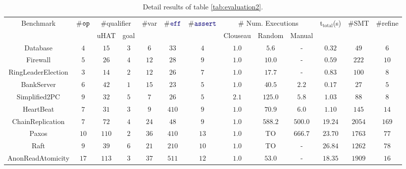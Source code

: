 \begin{table}[t!]
  \renewcommand{\arraystretch}{0.8}
  \caption{\small Detail results of table \ref{tab:evaluation2}.}
\vspace*{-.1in}
\footnotesize
\setlength{\tabcolsep}{3.3pt}
\begin{tabular}{c||ccc||ccc||ccc||c|cc}
  \toprule
Benchmark & \#$\boldsymbol{{\tt op}}$ & \multicolumn{2}{c||}{\#qualifier} & \#var &\#$\mykw{eff}$ & \#$\mykw{assert}$ & \multicolumn{3}{c||}{\scriptsize \# Num. Executions} & t$_\text{total}$(s) & \#SMT & \#refine \\
 &  &uHAT &goal & & & & {\scriptsize Clouseau} & {\scriptsize Random} & {\scriptsize Manual} &  &  \\
 \midrule
 {\scriptsize\textsf{Database}} & $4$ & $15$ & $3$ & $6$ & $3$$3$ & $4$ & $1.0$ & $5.6$ & - & $0.32$ & $49$ & $6$\\
 \midrule
{\scriptsize\textsf{Firewall}}\cite{MessageChain} & $5$ & $26$ & $4$ & $12$ & $2$$8$ & $9$ & $1.0$ & $10.0$ & - & $0.59$ & $222$ & $10$\\
\midrule
{\scriptsize\textsf{RingLeaderElection}}\cite{MessageChain} & $3$ & $14$ & $2$ & $12$ & $2$$6$ & $7$ & $1.0$ & $17.7$ & - & $0.83$ & $100$ & $8$\\
\midrule
{\scriptsize\textsf{BankServer}}\cite{DGJ+13} & $6$ & $42$ & $1$ & $15$ & $2$$3$ & $5$ & $1.0$ & $40.5$ & $2.2$ & $0.17$ & $27$ & $5$\\
\midrule
{\scriptsize\textsf{Simplified2PC}}\cite{DGJ+13} & $9$ & $32$ & $5$ & $7$ & $2$$6$ & $5$ & $2.1$ & $125.0$ & $5.8$ & $1.03$ & $88$ & $8$\\
\midrule
{\scriptsize\textsf{HeartBeat}}\cite{DGJ+13} & $7$ & $31$ & $3$ & $9$ & $4$$10$ & $9$ & $1.0$ & $70.9$ & $6.0$ & $1.10$ & $145$ & $14$\\
\midrule
{\scriptsize\textsf{ChainReplication}}\cite{ModP} & $7$ & $72$ & $4$ & $24$ & $4$$8$ & $9$ & $1.0$ & $588.2$ & $500.0$ & $19.24$ & $2054$ & $169$\\
\midrule
{\scriptsize\textsf{Paxos}}\cite{ModP} & $10$ & $110$ & $2$ & $36$ & $4$$10$ & $13$ & $1.0$ & {\tiny TO} & $666.7$ & $23.70$ & $1763$ & $77$\\
\midrule
{\scriptsize\textsf{Raft}} & $9$ & $39$ & $6$ & $21$ & $2$$10$ & $10$ & $1.0$ & {\tiny TO} & - & $26.84$ & $1262$ & $78$\\
\midrule
{\scriptsize\textsf{AnonReadAtomicity}} & $17$ & $113$ & $3$ & $37$ & $5$$11$ & $12$ & $1.0$ & $53.0$ & - & $18.35$ & $1909$ & $16$\\
\bottomrule
\end{tabular}
\label{tab:evaluation-detail2}
\end{table}

